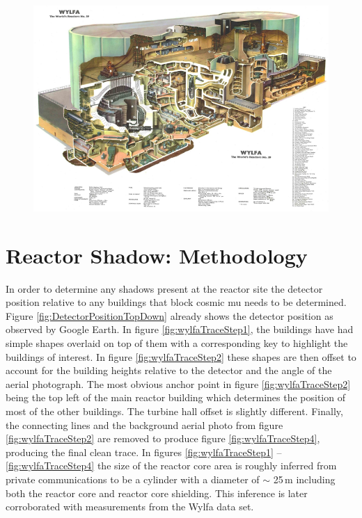 \begin{figure}[!h]
 \centering
 \includegraphics[width=0.6\linewidth]{Chapter5/Figs/wylfaRasterNew/wylfaReactorRoughStructure.png}
 \label{fig:wylfaReactorRoughStructure}
\end{figure}

\section{Reactor Shadow: Methodology} \label{sec:ReactorShadowMethodology}
In order to determine any shadows present at the reactor site the detector position relative to any buildings that block cosmic mu needs to be determined. Figure \ref{fig:DetectorPositionTopDown} already shows the detector position as observed by Google Earth. In figure \ref{fig:wylfaTraceStep1}, the buildings have had simple shapes overlaid on top of them with a corresponding key to highlight the buildings of interest. In figure \ref{fig:wylfaTraceStep2} these shapes are then offset to account for the building heights relative to the detector and the angle of the aerial photograph. The most obvious anchor point in figure \ref{fig:wylfaTraceStep2} being the top left of the main reactor building which determines the position of most of the other buildings. The turbine hall offset is slightly different. Finally, the connecting lines and the background aerial photo from figure \ref{fig:wylfaTraceStep2} are removed to produce figure \ref{fig:wylfaTraceStep4}, producing the final clean trace. In figures \ref{fig:wylfaTraceStep1}  -- \ref{fig:wylfaTraceStep4} the size of the reactor core area is roughly inferred from private communications to be a cylinder with a diameter of $\sim$ 25\,m including both the reactor core and reactor core shielding. This inference is later corroborated with measurements from the Wylfa data set. 

